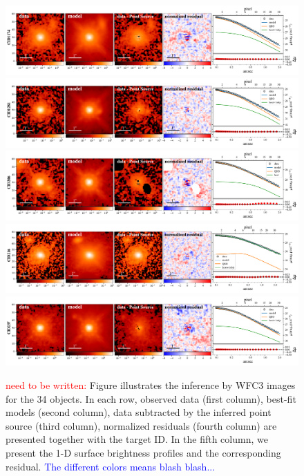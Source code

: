 \documentclass[apj]{emulateapj}
\begin{document}
\begin{figure}
\centering
{
\includegraphics[height=0.25\textwidth]{fig/best_fit_CID1174_SB_profile.pdf}
\includegraphics[height=0.25\textwidth]{fig/best_fit_CID1281_SB_profile.pdf}
\includegraphics[height=0.25\textwidth]{fig/best_fit_CID206_SB_profile.pdf}
\includegraphics[height=0.25\textwidth]{fig/best_fit_CID216_SB_profile.pdf}
\includegraphics[height=0.25\textwidth]{fig/best_fit_CID237_SB_profile.pdf}
\caption{\label{fig:QSO_decomp} 
\textcolor{red}{need to be written:}
Figure illustrates the inference by WFC3 images for the 34 objects.
In each row, observed data (first column), best-fit models (second column), data subtracted by the inferred point source (third column),  normalized residuals (fourth column) are presented together with the target ID. In the fifth column, we present the 1-D surface brightness profiles and the corresponding residual. \textcolor{blue}{The different colors means blash blash...}
}}
\end{figure}
\end{document}
